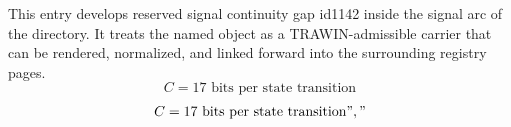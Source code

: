 
\begin{tzpsnapshot}
\end{tzpsnapshot}

This entry develops reserved signal continuity gap id1142 inside the signal arc of the directory. It treats the named object as a TRAWIN-admissible carrier that can be rendered, normalized, and linked forward into the surrounding registry pages.
\[
C = 17 \text{ bits per state transition}
\]
\[
C = 17 \text{ bits per state transition}","
\]


